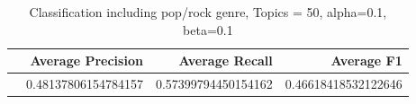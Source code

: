 \begin{table}[h]
\begin{subtable}[b]{0.5\textwidth}
\begin{tabular}{|l|r|r|r|}

\hline
\textbf{} &  \textbf{Average Precision} & \textbf{Average Recall} & \textbf{Average F1} \\
\hline
 &0.48137806154784157& 0.57399794450154162& 0.46618418532122646\\
 \hline
\end{tabular}
\caption{Classification including pop/rock genre, Topics = 50, alpha=0.1, beta=0.1}
\end{subtable}
\end{table}